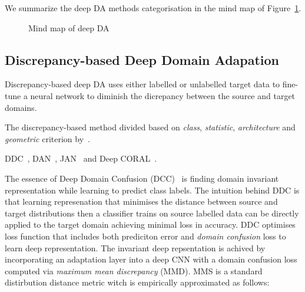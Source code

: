 We summarize the deep DA methods categorisation in the mind map of Figure~\ref{mind_map}.

\begin{figure}
	\caption{Mind map of deep DA}
	\label{mind_map}
\end{figure}

\subsection{Discrepancy-based Deep Domain Adapation}
\label{discrepancy_da}

Discrepancy-based deep DA uses either labelled or unlabelled target data
to fine-tune a neural network to diminish the dicrepancy
between the source and target domains.

The discrepancy-based method divided based on
\textit{class}, \textit{statistic}, \textit{architecture} and \textit{geometric}
criterion by~\cite{wang2018}.

DDC~\cite{tzeng2014}, DAN~\cite{long2015}, JAN~\cite{long2017}
and Deep CORAL~\cite{sun2016}.

The essence of Deep Domain Confusion (DCC)~\cite{tzeng2014} is finding domain invariant representation
while learning to predict class labels.
The intuition behind DDC is that learning represenation
that minimises the distance between source and target distributions
then a classifier trains on source labelled data
can be directly applied to the target domain achieving minimal loss in accuracy.
DDC optimises loss function that includes both prediciton error and \textit{domain confusion} loss to learn deep representation.
The invariant deep repsentation is achived by incorporating an adaptation layer
into a deep CNN with a domain confusion loss computed via \textit{maximum mean discrepancy} (MMD).
MMS is a standard distirbution distance metric
witch is empirically approximated as follows:

